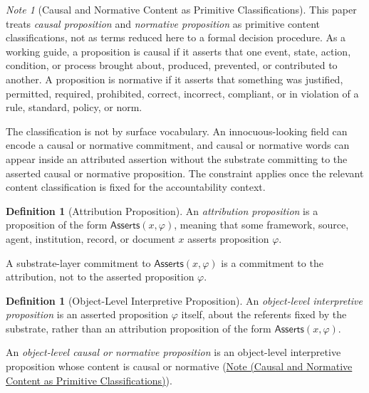 \documentclass[11pt]{article}
\theoremstyle{plain}
\theoremstyle{definition}
\newtheorem{definition}[theorem]{Definition}
\theoremstyle{remark}
\newtheorem{note}[theorem]{Note}
\newcommand{\NoteRef}[2]{\hyperref[#1]{Note (#2)}}
\newcommand{\Asserts}{\mathsf{Asserts}}
\begin{document}
\begin{note}[Causal and Normative Content as Primitive Classifications]
  \label{se100.note.CausalNormative}
  This paper treats \emph{causal proposition} and \emph{normative proposition}
  as primitive content classifications,
  not as terms reduced here to a formal decision procedure.
  As a working guide,
  a proposition is causal if it asserts that one event,
  state, action, condition, or process brought about, produced, prevented, or
  contributed to another.
  A proposition is normative if it asserts that something was justified,
  permitted, required, prohibited, correct, incorrect, compliant, or in
  violation of a rule, standard, policy, or norm.

  The classification is not by surface vocabulary.
  An innocuous-looking field can encode a causal or normative commitment,
  and causal or normative words can appear inside an attributed assertion
  without the substrate committing to the asserted causal or normative
  proposition.
  The constraint applies once the relevant content classification is fixed
  for the accountability context.
\end{note}




\begin{definition}[Attribution Proposition]
  \label{se100.def.AttributionProposition}
  An \emph{attribution proposition} is a proposition of the form
  $\Asserts(x,\varphi)$,
  meaning that some framework, source, agent, institution, record, or document $x$
  asserts proposition $\varphi$.

  A substrate-layer commitment to $\Asserts(x,\varphi)$ is a
  commitment to the attribution,
  not to the asserted proposition $\varphi$.
\end{definition}




\begin{definition}[Object-Level Interpretive Proposition]
  \label{se100.def.ObjectLevelInterpretiveProposition}
  An \emph{object-level interpretive proposition} is an asserted proposition
  $\varphi$ itself,
  about the referents fixed by the substrate,
  rather than an attribution proposition of the form
  $\Asserts(x,\varphi)$.

  An \emph{object-level causal or normative proposition} is
  an object-level interpretive proposition whose content is causal or normative
  (\NoteRef{se100.note.CausalNormative}{Causal and Normative Content as
    Primitive Classifications}).
\end{definition}
\end{document}
